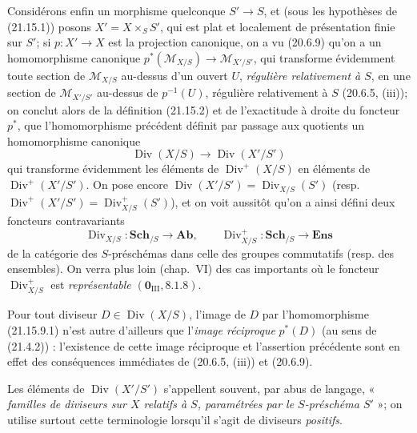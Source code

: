 \begin{env}[21.15.9]
Considérons enfin un morphisme quelconque $S'\to S$, et (sous les hypothèses de
(21.15.1)) posons $X'=X\times_S S'$, qui est plat et localement de présentation finie
sur $S'$; si $p:X'\to X$ est la projection canonique, on a vu (20.6.9) qu'on a un
homomorphisme canonique
$p^*(\mathscr M_{X/S})\to\mathscr M_{X'/S'}$, qui transforme évidemment toute
section de $\mathscr M_{X/S}$ au-dessus d'un ouvert $U$, \emph{régulière relativement
à $S$}, en une section de $\mathscr M_{X'/S'}$ au-dessus de $p^{-1}(U)$, régulière
relativement à $S$ (20.6.5, (iii)); on conclut alors de la
définition (21.15.2) et de l'exactitude à droite du foncteur $p^*$, que
l'homomorphisme précédent définit par passage aux quotients un homomorphisme canonique
\[
\label{IV.21.15.9.1}
  \operatorname{Div}(X/S)\longrightarrow\operatorname{Div}(X'/S')
  \tag{21.15.9.1}
\]
qui transforme évidemment les éléments de $\operatorname{Div}^+(X/S)$ en éléments de
$\operatorname{Div}^+(X'/S')$. On pose encore
$\operatorname{Div}(X'/S')=\operatorname{Div}_{X/S}(S')$ (resp.
$\operatorname{Div}^+(X'/S')=\operatorname{Div}_{X/S}^+(S')$), et on voit aussitôt
qu'on a ainsi défini deux foncteurs contravariants
\[
  \operatorname{Div}_{X/S}:\mathbf{Sch}_{/S}\longrightarrow\mathbf{Ab},\qquad
  \operatorname{Div}_{X/S}^+:\mathbf{Sch}_{/S}\longrightarrow\mathbf{Ens}
\]
de la catégorie des $S$-préschémas dans celle des groupes commutatifs (resp. des
ensembles). On verra plus loin (chap.~VI) des cas importants où le foncteur
$\operatorname{Div}_{X/S}^+$ est \emph{représentable} $(\mathbf 0_{\mathrm{III}},
8.1.8)$.

Pour tout diviseur $D\in\operatorname{Div}(X/S)$, l'image de $D$ par
l'homomorphisme (21.15.9.1) n'est autre d'ailleurs que l'\emph{image réciproque}
$p^*(D)$ (au sens de (21.4.2)) : l'existence de cette image réciproque et l'assertion
précédente sont en effet des conséquences immédiates de (20.6.5, (iii)) et (20.6.9).

Les éléments de $\operatorname{Div}(X'/S')$ s'appellent souvent, par abus de langage,
« \emph{familles de diviseurs sur $X$ relatifs à $S$, paramétrées par le
$S$-préschéma $S'$} »; on utilise surtout cette terminologie lorsqu'il s'agit de
diviseurs \emph{positifs}.
\end{env}
